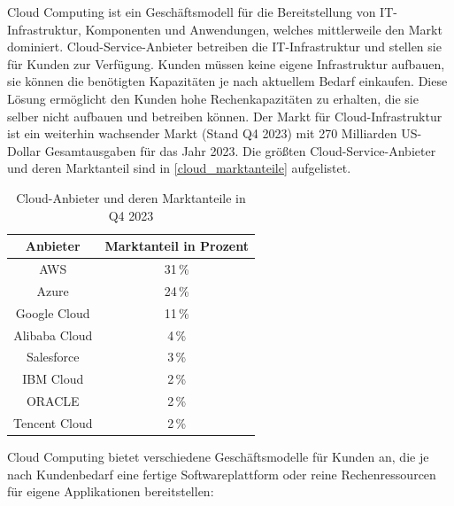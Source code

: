 Cloud Computing ist ein Geschäftsmodell für die Bereitstellung von IT-Infrastruktur, Komponenten und Anwendungen, welches mittlerweile den Markt dominiert. \cite{Benlian2018} Cloud-Service-Anbieter betreiben die IT-Infrastruktur und stellen sie für Kunden zur Verfügung. Kunden müssen keine eigene Infrastruktur aufbauen, sie können die benötigten Kapazitäten je nach aktuellem Bedarf einkaufen. Diese Lösung ermöglicht den Kunden hohe Rechenkapazitäten zu erhalten, die sie selber nicht aufbauen und betreiben können. \cite{Arasaratnam2011} Der Markt für Cloud-Infrastruktur ist ein weiterhin wachsender Markt (Stand Q4 2023) mit 270 Milliarden US-Dollar Gesamtausgaben für das Jahr 2023. Die größten Cloud-Service-Anbieter und deren Marktanteil sind in \autoref{cloud_marktanteile} aufgelistet.

\begin{table}
	\centering
		\caption{Cloud-Anbieter und deren Marktanteile in Q4 2023} 
		\label{cloud_marktanteile}
		\begin{tabular}{|c | c|} 
			\hline
			Anbieter & Marktanteil in Prozent \\
			\hline\hline
			AWS & 31\,\%\\ 
			\hline
			Azure & 24\,\% \\
			\hline
			Google Cloud & 11\,\% \\
			\hline
			Alibaba Cloud & 4\,\% \\
			\hline
			Salesforce & 3\,\% \\
			\hline
			IBM Cloud & 2\,\% \\ 
			\hline
			ORACLE & 2\,\% \\ 
			\hline
			Tencent Cloud & 2\,\% \\ 
			\hline
		\end{tabular}
\end{table}

Cloud Computing bietet verschiedene Geschäftsmodelle für Kunden an, die je nach Kundenbedarf eine fertige Softwareplattform oder reine Rechenressourcen für eigene Applikationen bereitstellen:

